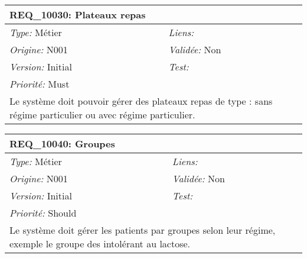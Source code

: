 \begin{table}[!h]

\begin{tabular}{|p{60mm}p{100mm}|}

\hline

\multicolumn{2}{|l|}{\textbf{REQ\_10030:} Plateaux repas} \\ \hline

\emph{Type:} Métier & \emph{Liens:}  \\

\emph{Origine:} N001 & \emph{Validée:} Non \\

\emph{Version:} Initial & \emph{Test:}  \\

\emph{Priorité:} Must & \\ \hline

\multicolumn{2}{|p{16cm}|}{Le système doit pouvoir gérer des plateaux repas de type : sans régime particulier ou avec régime particulier.} \\ \hline

\end{tabular}

\end{table}



\begin{table}[!h]

\begin{tabular}{|p{60mm}p{100mm}|}

\hline

\multicolumn{2}{|l|}{\textbf{REQ\_10040:} Groupes} \\ \hline

\emph{Type:} Métier & \emph{Liens:}  \\

\emph{Origine:} N001 & \emph{Validée:} Non \\

\emph{Version:} Initial & \emph{Test:}  \\

\emph{Priorité:} Should & \\ \hline

\multicolumn{2}{|p{16cm}|}{Le système doit gérer les patients par groupes selon leur régime, exemple le groupe des intolérant au lactose.} \\ \hline

\end{tabular}

\end{table}



